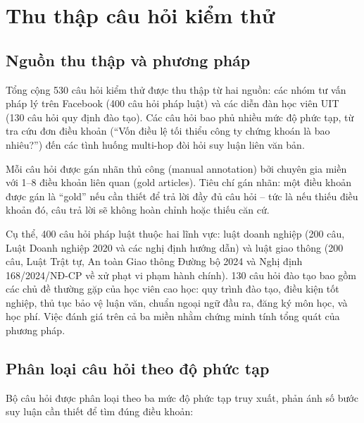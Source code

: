\section{Thu thập câu hỏi kiểm thử}
\label{sec:cau_hoi_kiem_thu}

\subsection{Nguồn thu thập và phương pháp}
\label{subsec:nguon_thuthap}

Tổng cộng 530 câu hỏi kiểm thử được thu thập từ hai nguồn: các nhóm tư vấn pháp
lý trên Facebook (400 câu hỏi pháp luật) và các diễn đàn học viên UIT (130 câu
hỏi quy định đào tạo). Các câu hỏi bao phủ nhiều mức độ phức tạp, từ tra
cứu đơn điều khoản (``Vốn điều lệ tối thiểu công ty chứng khoán là bao nhiêu?'')
đến các tình huống multi-hop đòi hỏi suy luận liên văn bản.

Mỗi câu hỏi được gán nhãn thủ công (manual annotation) bởi chuyên gia miền với
1--8 điều khoản liên quan (gold articles). Tiêu chí gán nhãn: một điều khoản được
gán là ``gold'' nếu cần thiết để trả lời đầy đủ câu hỏi -- tức là nếu thiếu điều
khoản đó, câu trả lời sẽ không hoàn chỉnh hoặc thiếu căn cứ.

Cụ thể, 400 câu hỏi pháp luật thuộc hai lĩnh vực: luật doanh nghiệp (200 câu,
Luật Doanh nghiệp 2020 và các nghị định hướng dẫn) và luật giao thông (200 câu,
Luật Trật tự, An toàn Giao thông Đường bộ 2024 và Nghị định 168/2024/NĐ-CP về
xử phạt vi phạm hành chính). 130 câu hỏi đào tạo bao gồm các chủ đề thường gặp
của học viên cao học: quy trình đào tạo, điều kiện tốt nghiệp, thủ tục bảo vệ luận
văn, chuẩn ngoại ngữ đầu ra, đăng ký môn học, và học phí. Việc đánh giá trên cả
ba miền nhằm chứng minh tính tổng quát của phương pháp.

\subsection{Phân loại câu hỏi theo độ phức tạp}
\label{subsec:phanloa_cauhoi}

Bộ câu hỏi được phân loại theo ba mức độ phức tạp truy xuất, phản ánh số bước suy
luận cần thiết để tìm đúng điều khoản:

